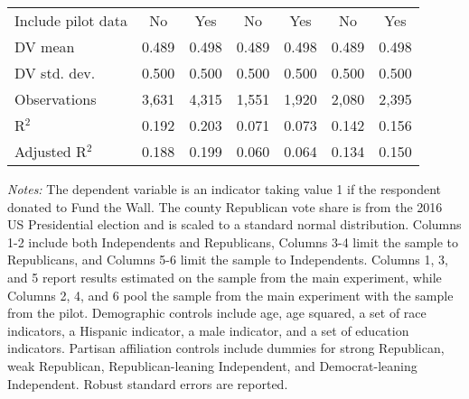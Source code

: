 \begin{table}[!htbp]
\begin{threeparttable}
\begin{tabular}{@{\hspace{5pt}}l@{\hspace{5pt}}cccccc}
\midrule
Include pilot data & No & Yes & No & Yes & No & Yes \\
\addlinespace
DV mean & 0.489 & 0.498 & 0.489 & 0.498 & 0.489 & 0.498 \\
DV std. dev. & 0.500 & 0.500 & 0.500 & 0.500 & 0.500 & 0.500 \\
Observations & 3,631 & 4,315 & 1,551 & 1,920 & 2,080 & 2,395 \\ 
R$^{2}$ & 0.192 & 0.203 & 0.071 & 0.073 & 0.142 & 0.156 \\ 
Adjusted R$^{2}$ & 0.188 & 0.199 & 0.060 & 0.064 & 0.134 & 0.150 \\ 
\bottomrule 
\end{tabular} 
\begin{tablenotes}
\footnotesize
\item \textit{Notes:} The dependent variable is an indicator taking value 1 if the respondent donated to Fund the Wall. The county Republican vote share is from the 2016 US Presidential election and is scaled to a standard normal distribution. Columns 1-2 include both Independents and Republicans, Columns 3-4 limit the sample to Republicans, and Columns 5-6 limit the sample to Independents. Columns 1, 3, and 5 report results estimated on the sample from the main experiment, while Columns 2, 4, and 6 pool the sample from the main experiment with the sample from the pilot. Demographic controls include age, age squared, a set of race indicators, a Hispanic indicator, a male indicator, and a set of education indicators. Partisan affiliation controls include dummies for strong Republican, weak Republican, Republican-leaning Independent, and Democrat-leaning Independent. Robust standard errors are reported.
\end{tablenotes}
\end{threeparttable}
\end{table} 
